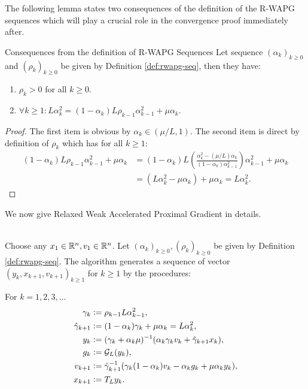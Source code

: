 \documentclass[12pt]{article}
\begin{document}
    The following lemma states two consequences of the definition of the R-WAPG sequences which will play a crucial role in the convergence proof immediately after.
    \begin{lemma}{Consequences from the definition of R-WAPG Sequences}\label{lemma:r-wapg-seq-consequences}
        Let sequence $(\alpha_k)_{k\ge 0}$ and $(\rho_k)_{k \ge0}$ be given by Definition \ref{def:rwapg-seq}, then they have:
        \begin{enumerate}
            \item $\rho_k > 0$ for all $k \ge 0$.
            \item $\forall k \ge 1: L\alpha_k^2 = (1 - \alpha_k)L\rho_{k - 1}\alpha_{k - 1}^2 +\mu\alpha_k$.
        \end{enumerate}
    \end{lemma}
    \begin{proof}
        The first item is obvious by $\alpha_k \in (\mu/L, 1)$.
        The second item is direct by definition of $\rho_k$ which has for all $k \ge 1$:
        \begin{align*}
            (1 - \alpha_k)L \rho_{k - 1}\alpha_{k - 1}^2 + \mu\alpha_k
            &= (1 - \alpha_k)L \left(
                \frac{\alpha_{k}^2 - (\mu/L)\alpha_{k}}{(1 - \alpha_{k})\alpha_{k - 1}^2}
            \right)\alpha_{k - 1}^2 + \mu\alpha_k
            \\
            &= (L\alpha_k^2 - \mu \alpha_k) + \mu \alpha_k = L\alpha_k^2.
        \end{align*}
    \end{proof}
    \par
    We now give Relaxed Weak Accelerated Proximal Gradient in details.
    \begin{definition}\label{def:wapg}\;\\
        Choose any $x_1 \in \mathbb R^n, v_1 \in \mathbb R^n$.
        Let $(\alpha_k)_{k \ge0}, (\rho_k)_{k \ge 0}$ be given by Definition \ref{def:rwapg-seq}.
        The algorithm generates a sequence of vector $(y_k, x_{k + 1}, v_{k + 1})_{k \ge 1}$ for $k\ge 1$ by the procedures:
        \begin{tcolorbox}
            For $k=1, 2, 3, \ldots$
            \begin{align*}
                \gamma_k &\vcentcolon= \rho_{k -1}L\alpha_{k - 1}^2,
                \\
                \hat \gamma_{k + 1} & \vcentcolon= (1 - \alpha_k)\gamma_k + \mu \alpha_k = L\alpha_k^2,
                \\
                y_k &\vcentcolon=
                (\gamma_k + \alpha_k \mu)^{-1}(\alpha_k \gamma_k v_k + \hat\gamma_{k + 1} x_k),
                \\
                g_k &\vcentcolon= \mathcal G_L (y_k),
                \\
                v_{k + 1} &\vcentcolon=
                \hat\gamma^{-1}_{k + 1}
                (\gamma_k(1 - \alpha_k) v_k - \alpha_k g_k + \mu \alpha_k y_k),
                \\
                x_{k + 1} &\vcentcolon= T_L y_k.
            \end{align*}
        \end{tcolorbox}
    \end{definition}
\end{document}
